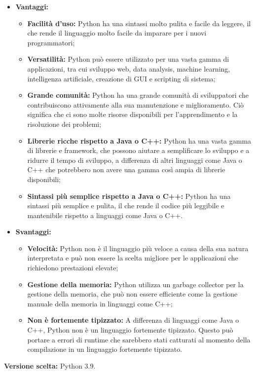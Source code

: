 \documentclass[10pt, a4paper]{article}
\begin{document}
\begin{itemize}
\item \textbf{Vantaggi:}
\begin{itemize}
\item \textbf{Facilità d'uso:} Python ha una sintassi molto pulita e facile da leggere, il che rende il linguaggio molto facile da imparare per i nuovi programmatori;
\item \textbf{Versatilità:} Python può essere utilizzato per una vasta gamma di applicazioni, tra cui sviluppo web, data analysis, machine learning, intelligenza artificiale, creazione di GUI e scripting di sistema;
\item \textbf{Grande comunità:} Python ha una grande comunità di sviluppatori che contribuiscono attivamente alla sua manutenzione e miglioramento. Ciò significa che ci sono molte risorse disponibili per l'apprendimento e la risoluzione dei problemi;
\item \textbf{Librerie ricche rispetto a Java o C++:} Python ha una vasta gamma di librerie e framework, che possono aiutare a semplificare lo sviluppo e a ridurre il tempo di sviluppo, a differenza di altri linguaggi come Java o C++ che potrebbero non avere una gamma così ampia di librerie disponibili;
\item \textbf{Sintassi più semplice rispetto a Java o C++:} Python ha una sintassi più semplice e pulita, il che rende il codice più leggibile e mantenibile rispetto a linguaggi come Java o C++.
\end{itemize}
\item \textbf{Svantaggi:}
\begin{itemize}
\item \textbf{Velocità:} Python non è il linguaggio più veloce a causa della sua natura interpretata e può non essere la scelta migliore per le applicazioni che richiedono prestazioni elevate;
\item \textbf{Gestione della memoria:} Python utilizza un garbage collector per la gestione della memoria, che può non essere efficiente come la gestione manuale della memoria in linguaggi come C++;
\item \textbf{Non è fortemente tipizzato:} A differenza di linguaggi come Java o C++, Python non è un linguaggio fortemente tipizzato. Questo può portare a errori di runtime che sarebbero stati catturati al momento della compilazione in un linguaggio fortemente tipizzato.
\end{itemize}
\end{itemize}
\textbf{Versione scelta:} Python 3.9.
\end{document}
